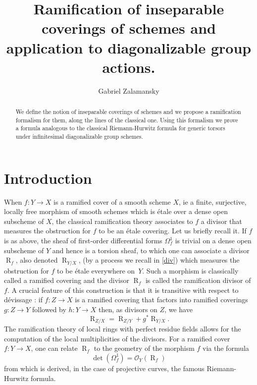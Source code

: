 \documentclass{amsart}
\theoremstyle{definition}
\theoremstyle{remark}
\begin{document}
 
\title[Ramification of inseparable coverings]{Ramification of inseparable coverings of schemes and application to diagonalizable group actions.}
\date{}
\author{Gabriel Zalamansky}
\address{Mathematisch Instituut, Universiteit Leiden, Niels Bohrweg 1,
2333 CA Leiden, The Netherlands.}


 
 
 
 
 
\begin{abstract}
 We define the notion of inseparable coverings of schemes and we propose a ramification formalism for them, along the lines of the classical one. Using this formalism we prove a formula analogous to the classical Riemann-Hurwitz formula for generic torsors under infinitesimal diagonalizable group schemes.
\end{abstract}
 
\maketitle

 

\section{Introduction}

When $f : Y {\longrightarrow} X$ is a ramified cover of a smooth scheme $X$, ie a finite, surjective, locally free morphism of smooth schemes which is \'etale over a dense open subscheme of $X$, the classical ramification theory associates to $f$ a divisor that measures the obstruction for $f$ to be an \'etale covering. Let us briefly recall it.
\label{classic}
If $f$ is as above, the sheaf of first-order differential forms $\Omega^1_f$ is trivial on a dense open subscheme of $Y$ and hence is a torsion sheaf, to which one can associate a divisor $\operatorname{R}_f$, also denoted $\operatorname{R}_{Y/X}$, (by a process we recall in \ref{div}) which measures the obstruction for $f$ to be \'etale everywhere on~$Y$. Such a morphism is classically called a ramified covering and the divisor $\operatorname{R}_f$ is called the ramification divisor of $f$. A crucial feature of this construction is that it is transitive with respect to d\'evissage : if $f : Z {\longrightarrow} X$ is a ramified covering that factors into ramified coverings $g : Z {\longrightarrow} Y$ followed by $h : Y {\longrightarrow} X$ then, as divisors on $Z$, we have \[ \label{trans} \tag{*} \operatorname{R}_{Z/X}= \operatorname{R}_{Z/Y} + g^*\operatorname{R}_{Y/X}. \] 
The ramification theory of local rings with perfect residue fields allows for the computation of the local multiplicities of the divisors. For a ramified cover $f : Y {\longrightarrow} X$, one can relate $\operatorname{R}_{f}$ to the geometry of the morphism $f$ via the formula \[ \label{RH} \tag{RH} \det(\Omega^1_f) = {{\mathcal O}}_Y(\operatorname{R}_f) \] from which is derived, in the case of projective curves, the famous Riemann-Hurwitz formula.
  
\end{document}
